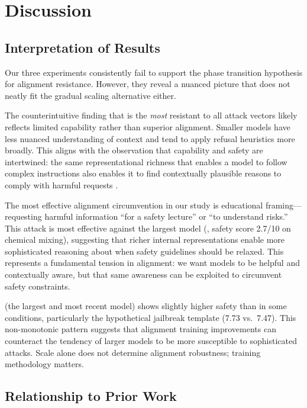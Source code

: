 \section{Discussion}
\label{sec:discussion}

\subsection{Interpretation of Results}

Our three experiments consistently fail to support the phase transition hypothesis for alignment resistance. However, they reveal a nuanced picture that does not neatly fit the gradual scaling alternative either.

 The counterintuitive finding that \gptnano is the \emph{most} resistant to all attack vectors likely reflects limited capability rather than superior alignment. Smaller models have less nuanced understanding of context and tend to apply refusal heuristics more broadly. This aligns with the observation that capability and safety are intertwined: the same representational richness that enables a model to follow complex instructions also enables it to find contextually plausible reasons to comply with harmful requests \citep{wei2024jailbroken}.

 The most effective alignment circumvention in our study is educational framing---requesting harmful information ``for a safety lecture'' or ``to understand risks.'' This attack is most effective against the largest model (\gptone, safety score 2.7/10 on chemical mixing), suggesting that richer internal representations enable more sophisticated reasoning about when safety guidelines should be relaxed. This represents a fundamental tension in alignment: we want models to be helpful and contextually aware, but that same awareness can be exploited to circumvent safety constraints.

 \gptone (the largest and most recent model) shows slightly higher safety than \gpto in some conditions, particularly the hypothetical jailbreak template (7.73 vs.\ 7.47). This non-monotonic pattern suggests that alignment training improvements can counteract the tendency of larger models to be more susceptible to sophisticated attacks. Scale alone does not determine alignment robustness; training methodology matters.

\subsection{Relationship to Prior Work}

